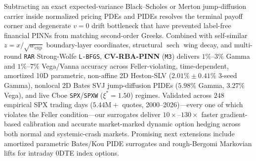 \documentclass[preprint,12pt]{elsarticle}
\begin{document}
Subtracting an exact expected-variance Black--Scholes or Merton jump-diffusion carrier inside normalized pricing PDEs and PIDEs resolves the terminal payoff corner and degenerate $v = 0$ drift bottleneck that have prevented label-free financial PINNs from matching second-order Greeks. Combined with self-similar $z = x/\sqrt{w_{\mathrm{exp}}}$ boundary-layer coordinates, structural $\operatorname{sech}$ wing decay, and multi-round \texttt{RAR} Strong-Wolfe \texttt{L-BFGS}, \textbf{CV-RBA-PINN} (\texttt{M3}) delivers $1\%\text{--}3\%$ Gamma and $1\%\text{--}7\%$ Vega/Vanna accuracy across Feller-violating, time-dependent, amortized 10D parametric, non-affine 2D Heston-SLV ($2.01\% \pm 0.41\%$ 3-seed Gamma), nonlocal 2D Bates SVJ jump-diffusion PIDEs ($5.98\%$ Gamma, $3.27\%$ Vega), and live Cboe \texttt{SPX}/\texttt{SPXW} ($\xi^* = 1.50$) regimes. Validated across $248$ empirical SPX trading days ($5.44\text{M}+$ quotes, 2000--2026)---every one of which violates the Feller condition---our surrogates deliver $10\times\text{--}130\times$ faster gradient-based calibration and accurate market-marked dynamic option hedging across both normal and systemic-crash markets. Promising next extensions include amortized parametric Bates/Kou PIDE surrogates and rough-Bergomi Markovian lifts for intraday 0DTE index options.



\end{document}
